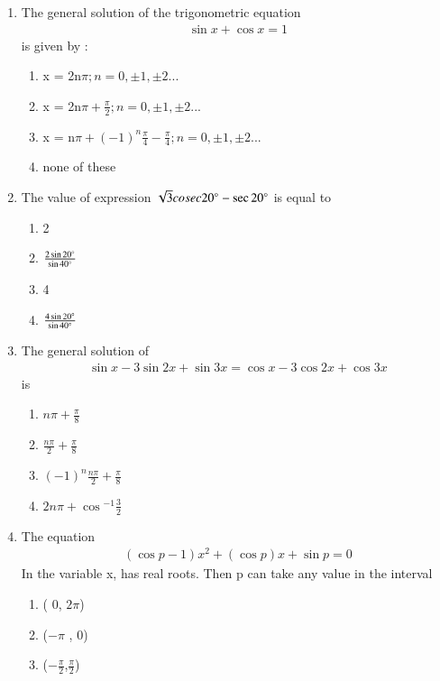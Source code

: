 \begin{enumerate}[label=\arabic*.,ref=\thesubsection.\theenumi]
   \item The general solution of the trigonometric equation 
   \begin{align}
      \sin{x} +\cos{x} = 1
   \end{align} is given by :
   \begin{enumerate}
       \item x = 2n$\pi; n= 0,\pm1,\pm2...$
       \item x = 2n$\pi + {\frac{\pi}{2}}; n= 0,\pm1,\pm2...$
       \item x = n$\pi + (-1)^n \frac{\pi}{4} - \frac{\pi}{4}; n= 0,\pm1,\pm2...$
       \item none of these
   \end{enumerate}
   \item The value of expression $\sqrt{3}cosec 20\degree-\sec{20\degree}$ is equal to 
   \begin{enumerate}
       \item 2
       \item $\frac{2\sin{20\degree}}{\sin{40\degree}}$
       \item 4
       \item $\frac{4\sin{20\degree}}{\sin{40\degree}}$
   \end{enumerate}
   \item The general solution of
   \begin{align}
       \sin{x}-3\sin{2x} +\sin{3x} =
       \cos{x} - 3\cos{2x} +\cos{3x}
   \end{align} is 
   \begin{enumerate}
       \item $n\pi + \frac{\pi}{8}$
       \item $\frac{n\pi}{2} + \frac{\pi}{8}$
       \item $(-1)^n \frac{n\pi}{2} + \frac{\pi}{8}$
       \item $2n\pi + \cos{^{-1}\frac{3}{2}}$
   \end{enumerate}
   \item The equation  \begin{align}
       (\cos{p} - 1) x^2 + (\cos{p}) x + \sin{p} = 0
   \end{align} In the variable x, has real roots. Then p can take any value in the interval
   \begin{enumerate}
       \item ( 0, $2\pi$)
       \item ($-\pi$ , 0) 
       \item ({$-\frac{\pi}{2}$},{$\frac{\pi}{2}$})

\end{enumerate}
\end{enumerate}
